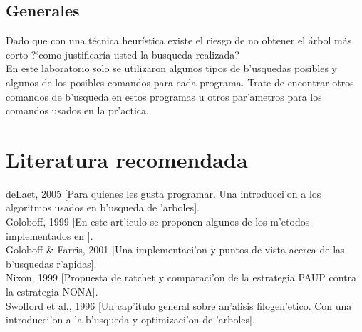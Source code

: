 \subsection{Generales}
\noindent
Dado que con una t\'ecnica heur\'istica existe el riesgo de no obtener el
\'arbol m\'as corto ?`como justificar\'ia usted la busqueda realizada?\\
En este laboratorio solo se utilizaron algunos tipos de b'usquedas posibles y
algunos de los posibles comandos para cada programa. Trate de encontrar otros
comandos de b'usqueda en estos programas u otros par'ametros para los comandos
usados en la pr'actica.
\section{Literatura recomendada}
\noindent
deLaet, 2005 [Para quienes les gusta programar. Una introducci'on a los
algoritmos usados en b'usqueda de 'arboles].\\
Goloboff, 1999 [En este art'iculo se proponen algunos de los m'etodos
implementados en ].\\
Goloboff \& Farris, 2001 [Una implementaci'on y puntos de vista acerca de las
b'usquedas r'apidas].\\
Nixon, 1999 [Propuesta de ratchet y comparaci'on de la estrategia PAUP contra la
estrategia NONA].\\
Swofford et al., 1996 [Un cap'itulo general sobre an'alisis filogen'etico. Con
una introducci'on a la b'usqueda y optimizaci'on de 'arboles].